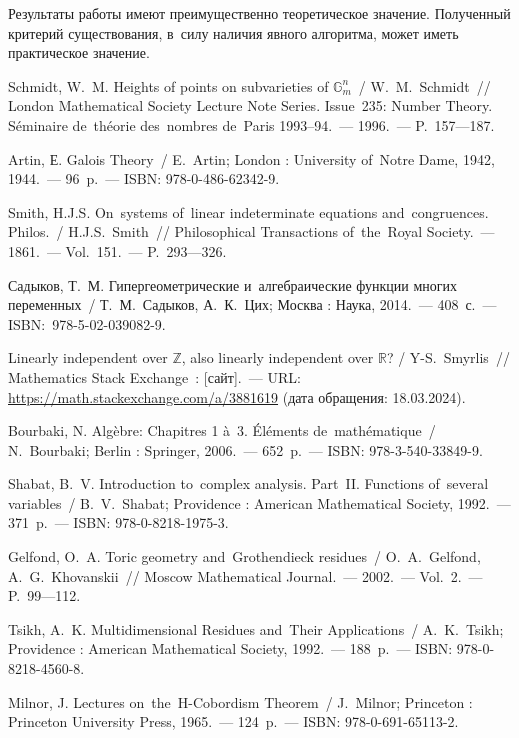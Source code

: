 \documentclass[a4paper,oneside]{article}
\begin{document}
Результаты работы имеют преимущественно теоретическое значение. Полученный критерий существования,
в~силу наличия явного алгоритма, может иметь практическое значение.

\pagebreak

\begin{thebibliography}{}
\setlength\itemindent{12.5mm}

 Schmidt, W.~M. Heights of points on subvarieties of $\mathbb{G}^n_m$~/ W.~M.~{Sch\-midt}~//
London Mathematical Society Lecture Note Series. Issue~235: Number Theory.
Séminaire de~théorie des~nombres de~Paris 1993–94.~— 1996.~— P.~157—187.

 Artin, Е. Galois Theory~/ E.~Artin; London : University of~Notre Dame, 1942, 1944.~— 96~p.~— ISBN: 978-0-486-62342-9.

 Smith, H.J.S. On~systems of~linear indeterminate equations and~{con\-gru\-ences}. Philos.~/ H.J.S.~Smith~//
Philosophical Transactions of~the~Royal Society.~— 1861.~— Vol.~151.~— P.~293—326.

 Садыков, Т.~М. Гипергеометрические и~алгебраические функции многих переменных~/ Т.~М.~Садыков, А.~К.~Цих;
Москва : Наука, 2014.~— 408~с.~— ISBN: 978-5-02-039082-9.

 Linearly independent over $\mathbb{Z}$, also linearly independent over $\mathbb{R}$? / Y-S.~Smyrlis~//
Mathematics Stack Exchange~: [сайт].~— URL: \url{https://math.stackexchange.com/a/3881619} (дата обращения: 18.03.2024).

 Bourbaki, N. Algèbre: Chapitres 1 à~3. Éléments de~mathématique~/ N.~Bourbaki; Berlin : Springer, 2006.~— 652~p.~— ISBN: 978-3-540-33849-9.

 Shabat, B.~V. Introduction to~complex analysis. Part~II. Functions of~several variables~/ B.~V.~Shabat; Providence : American Mathematical Society, 1992.~— 371~p.~— ISBN: 978-0-8218-1975-3.

 Gelfond, O.~A. Toric geometry and~Grothendieck residues~/ O.~A.~{Gel\-fond}, A.~G.~Khovanskii~//
Moscow Mathematical Journal.~— 2002.~— Vol.~2.~— P.~99—112.

 Tsikh, A.~K. Multidimensional Residues and~Their Applications~/ A.~K.~Tsikh; Providence : American Mathematical Society, 1992.~— 188~p.~— ISBN: 978-0-8218-4560-8.

 Milnor, J. Lectures on~the~H-Cobordism Theorem~/ J.~Milnor; Princeton : Princeton University Press, 1965.~— 124~p.~— ISBN: 978-0-691-65113-2.


\end{thebibliography}
\end{document}
